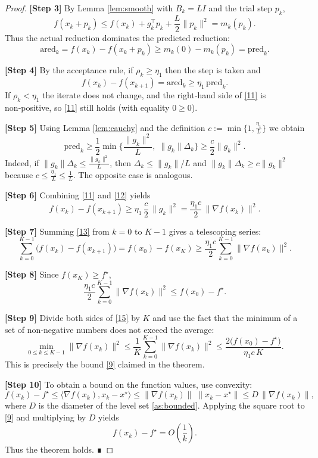 \documentclass{article}
\begin{document}
\begin{proof}
\textbf{[Step 3]}  By Lemma \ref{lem:smooth} with $B_{k}=L I$ and the trial step $p_{k}$,
\[
f(x_{k}+p_{k})\le f(x_{k})+g_{k}^{\top}p_{k}
+\frac{L}{2}\|p_{k}\|^{2}=m_{k}(p_{k}).
\]
Thus the actual reduction dominates the predicted reduction:
\[
\text{ared}_{k}=f(x_{k})-f(x_{k}+p_{k})
\ge m_{k}(0)-m_{k}(p_{k})=\text{pred}_{k}.
\tag{10}
\]

\textbf{[Step 4]}  By the acceptance rule,
if $\rho_{k}\ge\eta_{1}$ then the step is taken and
\[
f(x_{k})-f(x_{k+1})=\text{ared}_{k}
\ge\eta_{1}\,\text{pred}_{k}.
\tag{11}
\]
If $\rho_{k}<\eta_{1}$ the iterate does not change, and
the right‑hand side of \eqref{11} is non‑positive, so \eqref{11}
still holds (with equality $0\ge0$).

\textbf{[Step 5]}  Using Lemma \ref{lem:cauchy} and
the definition $c:=\min\{1,\frac{\eta_{1}}{L}\}$ we obtain
\[
\text{pred}_{k}
\ge\frac12\min\!\Big\{\frac{\|g_{k}\|^{2}}{L},\;\|g_{k}\|\Delta_{k}\Big\}
\ge\frac{c}{2}\|g_{k}\|^{2}.
\tag{12}
\]
Indeed, if $\|g_{k}\|\Delta_{k}\le\frac{\|g_{k}\|^{2}}{L}$,
then $\Delta_{k}\le\|g_{k}\|/L$ and
$\|g_{k}\|\Delta_{k}\ge c\|g_{k}\|^{2}$ because $c\le\frac{\eta_{1}}{L}\le\frac{1}{L}$.
The opposite case is analogous.

\textbf{[Step 6]}  Combining \eqref{11} and \eqref{12} yields
\[
f(x_{k})-f(x_{k+1})
\ge\eta_{1}\,\frac{c}{2}\,\|g_{k}\|^{2}
= \frac{\eta_{1}c}{2}\,\|\nabla f(x_{k})\|^{2}.
\tag{13}
\]

\textbf{[Step 7]}  Summing \eqref{13} from $k=0$ to $K-1$ gives a telescoping series:
\[
\sum_{k=0}^{K-1}\bigl(f(x_{k})-f(x_{k+1})\bigr)
= f(x_{0})-f(x_{K})
\ge\frac{\eta_{1}c}{2}\sum_{k=0}^{K-1}\|\nabla f(x_{k})\|^{2}.
\tag{14}
\]

\textbf{[Step 8]}  Since $f(x_{K})\ge f^{\star}$,
\[
\frac{\eta_{1}c}{2}\sum_{k=0}^{K-1}\|\nabla f(x_{k})\|^{2}
\le f(x_{0})-f^{\star}.
\tag{15}
\]

\textbf{[Step 9]}  Divide both sides of \eqref{15} by $K$ and use the fact that
the minimum of a set of non‑negative numbers does not exceed the average:
\[
\min_{0\le k\le K-1}\|\nabla f(x_{k})\|^{2}
\le\frac{1}{K}\sum_{k=0}^{K-1}\|\nabla f(x_{k})\|^{2}
\le\frac{2\bigl(f(x_{0})-f^{\star}\bigr)}{\eta_{1}c\,K}.
\tag{16}
\]
This is precisely the bound \eqref{9} claimed in the theorem.

\textbf{[Step 10]}  To obtain a bound on the function values,
use convexity:
\[
f(x_{k})-f^{\star}\le\langle\nabla f(x_{k}),x_{k}-x^{\star}\rangle
\le \|\nabla f(x_{k})\|\; \|x_{k}-x^{\star}\|
\le D\,\|\nabla f(x_{k})\|,
\]
where $D$ is the diameter of the level set \eqref{as:bounded}.
Applying the square root to \eqref{9} and multiplying by $D$ yields
\[
f(x_{k})-f^{\star}=O\!\left(\frac{1}{k}\right).
\tag{17}
\]
Thus the theorem holds.  ∎
\end{proof}
\end{document}
